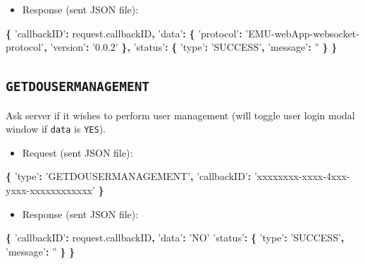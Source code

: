 \documentclass[]{book}
\newenvironment{Shaded}{\begin{snugshade}}{\end{snugshade}}
\newcommand{\AttributeTok}[1]{\textcolor[rgb]{0.77,0.63,0.00}{#1}}
\newcommand{\NormalTok}[1]{#1}
\newcommand{\OperatorTok}[1]{\textcolor[rgb]{0.81,0.36,0.00}{\textbf{#1}}}
\newcommand{\StringTok}[1]{\textcolor[rgb]{0.31,0.60,0.02}{#1}}
\newcommand{\VariableTok}[1]{\textcolor[rgb]{0.00,0.00,0.00}{#1}}
\providecommand{\tightlist}{%
  \setlength{\itemsep}{0pt}\setlength{\parskip}{0pt}}
\begin{document}
\begin{itemize}
\tightlist
\item
  Response (sent JSON file):
\end{itemize}

\begin{Shaded}
\begin{Highlighting}[]
\OperatorTok{\{}
  \StringTok{'callbackID'}\OperatorTok{:} \VariableTok{request}\NormalTok{.}\AttributeTok{callbackID}\OperatorTok{,}
  \StringTok{'data'}\OperatorTok{:} \OperatorTok{\{}
    \StringTok{'protocol'}\OperatorTok{:} \StringTok{'EMU-webApp-websocket-protocol'}\OperatorTok{,}
    \StringTok{'version'}\OperatorTok{:} \StringTok{'0.0.2'}
  \OperatorTok{\},}
  \StringTok{'status'}\OperatorTok{:} \OperatorTok{\{}
    \StringTok{'type'}\OperatorTok{:} \StringTok{'SUCCESS'}\OperatorTok{,}
    \StringTok{'message'}\OperatorTok{:} \StringTok{''}
  \OperatorTok{\}}
\OperatorTok{\}}
\end{Highlighting}
\end{Shaded}

\hypertarget{getdousermanagement}{%
\subsection{\texorpdfstring{\texttt{GETDOUSERMANAGEMENT}}{GETDOUSERMANAGEMENT}}\label{getdousermanagement}}

Ask server if it wishes to perform user management (will toggle user login modal window if \texttt{data} is \texttt{YES}).

\begin{itemize}
\tightlist
\item
  Request (sent JSON file):
\end{itemize}

\begin{Shaded}
\begin{Highlighting}[]
\OperatorTok{\{}
  \StringTok{'type'}\OperatorTok{:} \StringTok{'GETDOUSERMANAGEMENT'}\OperatorTok{,}
  \StringTok{'callbackID'}\OperatorTok{:} \StringTok{'xxxxxxxx-xxxx-4xxx-yxxx-xxxxxxxxxxxx'}
\OperatorTok{\}}
\end{Highlighting}
\end{Shaded}

\begin{itemize}
\tightlist
\item
  Response (sent JSON file):
\end{itemize}

\begin{Shaded}
\begin{Highlighting}[]
\OperatorTok{\{}
  \StringTok{'callbackID'}\OperatorTok{:} \VariableTok{request}\NormalTok{.}\AttributeTok{callbackID}\OperatorTok{,}
  \StringTok{'data'}\OperatorTok{:} \StringTok{'NO'}
  \StringTok{'status'}\OperatorTok{:} \OperatorTok{\{}
    \StringTok{'type'}\OperatorTok{:} \StringTok{'SUCCESS'}\OperatorTok{,}
    \StringTok{'message'}\OperatorTok{:} \StringTok{''}
  \OperatorTok{\}}
\OperatorTok{\}}
\end{Highlighting}
\end{Shaded}
\end{document}

